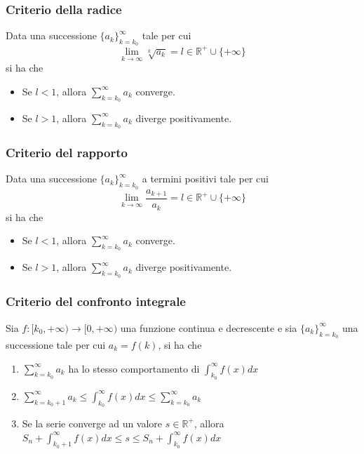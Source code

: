             \subsubsection{Criterio della radice}
                Data una successione $\{a_{k}\}_{k = k_{0}}^{\infty}$ tale per cui
                \[
                    \lim_{k \rightarrow \infty} \sqrt[k]{a_{k}} = l \in \mathbb{R}^{+} \cup \{+\infty\}
                \]
                si ha che
                \begin{itemize}
                    \item Se $l < 1$, allora $\sum_{k = k_{0}}^{\infty} a_{k}$ converge.
                    \item Se $l > 1$, allora $\sum_{k = k_{0}}^{\infty} a_{k}$ diverge positivamente.
                \end{itemize}

            \subsubsection{Criterio del rapporto}
                Data una successione $\{a_{k}\}_{k = k_{0}}^{\infty}$ a termini positivi tale per cui
                \[
                    \lim_{k \rightarrow \infty} \frac{a_{k + 1}}{a_{k}} = l \in \mathbb{R}^{+} \cup \{+\infty\}
                \]
                si ha che
                \begin{itemize}
                    \item Se $l < 1$, allora $\sum_{k = k_{0}}^{\infty} a_{k}$ converge.
                    \item Se $l > 1$, allora $\sum_{k = k_{0}}^{\infty} a_{k}$ diverge positivamente.
                \end{itemize}

            \subsubsection{Criterio del confronto integrale}
                Sia $f: [k_{0}, +\infty) \rightarrow [0, +\infty)$ una funzione continua e decrescente e sia $\{a_{k}\}_{k = k_{0}}^{\infty}$ una successione tale per cui $a_{k} = f(k)$, si ha che
                \begin{enumerate}[label=(\arabic*)]
                    \item $\displaystyle \sum_{k = k_{0}}^{\infty} a_{k}$ ha lo stesso comportamento di $\displaystyle \int_{k_{0}}^{\infty} f(x) dx$
                    \item $\displaystyle \sum_{k = k_{0} + 1}^{\infty} a_{k} \leq \int_{k_{0}}^{\infty} f(x) dx \leq \sum_{k = k_{0}}^{\infty} a_{k}$
                    \item Se la serie converge ad un valore $s \in \mathbb{R}^{+}$, allora $\displaystyle S_{n} + \int_{k_{0} + 1}^{\infty} f(x) dx \leq s \leq S_{n} + \int_{k_{0}}^{\infty} f(x) dx$
                \end{enumerate}

